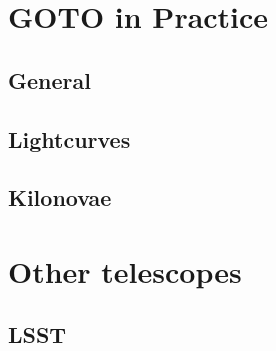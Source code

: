 \documentclass[twocolumn]{aastex631}
\newcommand{\placeholder}[1]{{\color{gray} \lipsum[#1]}}
\begin{document}
\section{GOTO in Practice}
\subsection{General}
\citet{Gompertz+2020}
\placeholder{5}

\subsection{Lightcurves}
\citet{Burhanudin+2021}
\placeholder{6}

\subsection{Kilonovae}
\citet{Chase+2022}
\placeholder{7}

\section{Other telescopes}
\subsection{LSST}
\citet{Andreoni+2022}
\placeholder{8}


{}
\end{document}
